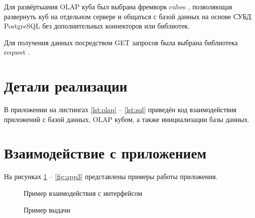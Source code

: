 Для развёртыания OLAP куба был выбрана фремворк cubes \cite{cube-lib}, позволяющая развернуть куб на отдельном сервере и общаться с базой данных на основе СУБД PostgreSQL 
\cite{python} без дополнительных коннекторов или библиотек.

Для получения данных посредством GET запросов была выбрана библиотека request \cite{requests-lib}.

\section{Детали реализации}

В приложении на листингах \ref{lst:olap} -- \ref{lst:sql} приведён код взаимодействия приложений с базой данных, OLAP кубом, а также инициализации базы данных.


\section{Взаимодействие с приложением}

На рисунках \ref{fig:app1} -- \ref{fig:app3} представлены примеры работы приложения.

\begin{figure}[!h]
	\caption{Пример взаимодействия с интерфейсом}
	\label{fig:app1}
\end{figure}

\begin{figure}[!h]
	\caption{Пример выдачи}
	\label{fig:app2}
\end{figure}

